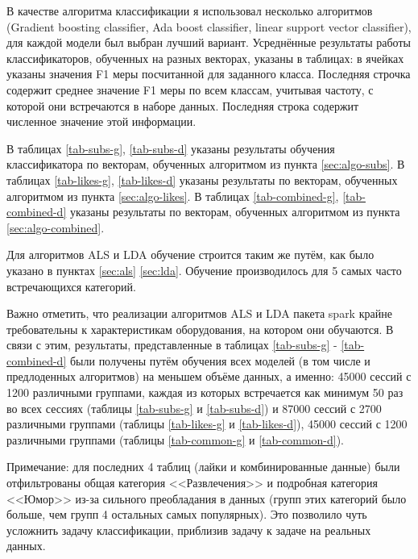 \documentclass[times,specification,annotation]{itmo-student-thesis}
\begin{document}
В качестве алгоритма классификации я использовал несколько алгоритмов (Gradient boosting classifier, Ada boost classifier, linear support vector classifier), для каждой модели был выбран лучший вариант. Усреднённые результаты работы классификаторов, обученных на разных векторах, указаны в таблицах: в ячейках указаны значения F1 меры посчитанной для заданного класса. Последняя строчка содержит среднее значение F1 меры по всем классам, учитывая частоту, с которой они встречаются в наборе данных. Последняя строка содержит численное значение этой информации.

В таблицах \ref{tab-subs-g}, \ref{tab-subs-d} указаны результаты обучения классификатора по векторам, обученных алгоритмом из пункта \ref{sec:algo-subs}. В таблицах \ref{tab-likes-g}, \ref{tab-likes-d} указаны результаты по векторам, обученных алгоритмом из пункта \ref{sec:algo-likes}. В таблицах \ref{tab-combined-g}, \ref{tab-combined-d} указаны результаты по векторам, обученных алгоритмом из пункта \ref{sec:algo-combined}. 

Для алгоритмов ALS и LDA обучение строится таким же путём, как было указано в пунктах \ref{sec:als} \ref{sec:lda}. Обучение производилось для 5 самых часто встречающихся категорий.

Важно отметить, что реализации алгоритмов ALS и LDA пакета spark крайне требовательны к характеристикам оборудования, на котором они обучаются. В связи с этим, результаты, представленные в таблицах \ref{tab-subs-g} - \ref{tab-combined-d} были получены путём обучения всех моделей (в том числе и предлоденных алгоритмов) на меньшем объёме данных, а именно: 45000 сессий с 1200 различными группами, каждая из которых встречается как минимум 50 раз во всех сессиях (таблицы  \ref{tab-subs-g} и \ref{tab-subs-d}) и 87000 сессий с 2700 различными группами (таблицы \ref{tab-likes-g} и \ref{tab-likes-d}), 45000 сессий с 1200 различными группами (таблицы \ref{tab-common-g} и \ref{tab-common-d}). 

Примечание: для последних 4 таблиц (лайки и комбинированные данные) были отфильтрованы общая категория <<Развлечения>> и подробная категория <<Юмор>> из-за сильного преобладания в данных (групп этих категорий было больше, чем групп 4 остальных самых популярных). Это позволило чуть усложнить задачу классификации, приблизив задачу к задаче на реальных данных.   
\end{document}
